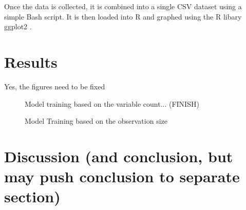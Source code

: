 \documentclass[12pt]{article}
\begin{document}
Once the data is collected, it is combined into a single CSV dataset using a simple Bash script.
It is then loaded into R \cite{lang_r} and graphed using the R libary ggplot2 \cite{lib_ggplot2}.

\section{Results}

Yes, the figures need to be fixed

\begin{figure}
	\begin{center}
		
	\end{center}
	\caption{Model training based on the variable count... (FINISH)}
\end{figure}

\begin{figure}
	\begin{center}
		
	\end{center}
	\caption{Model Training based on the observation size}
\end{figure}

\section{Discussion (and conclusion, but may push conclusion to separate section)}




%
\end{document}
